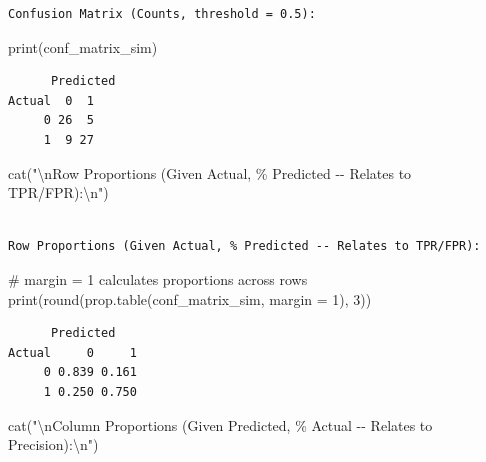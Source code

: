 \documentclass[
  letterpaper,
  DIV=11,
  numbers=noendperiod]{scrreprt}
\newenvironment{Shaded}{\begin{snugshade}}{\end{snugshade}}
\newcommand{\AttributeTok}[1]{\textcolor[rgb]{0.40,0.45,0.13}{#1}}
\newcommand{\CommentTok}[1]{\textcolor[rgb]{0.37,0.37,0.37}{#1}}
\newcommand{\DecValTok}[1]{\textcolor[rgb]{0.68,0.00,0.00}{#1}}
\newcommand{\FunctionTok}[1]{\textcolor[rgb]{0.28,0.35,0.67}{#1}}
\newcommand{\NormalTok}[1]{\textcolor[rgb]{0.00,0.23,0.31}{#1}}
\newcommand{\SpecialCharTok}[1]{\textcolor[rgb]{0.37,0.37,0.37}{#1}}
\newcommand{\StringTok}[1]{\textcolor[rgb]{0.13,0.47,0.30}{#1}}
\begin{document}
\begin{verbatim}
Confusion Matrix (Counts, threshold = 0.5):
\end{verbatim}

\begin{Shaded}
\begin{Highlighting}[]
\FunctionTok{print}\NormalTok{(conf\_matrix\_sim)}
\end{Highlighting}
\end{Shaded}

\begin{verbatim}
      Predicted
Actual  0  1
     0 26  5
     1  9 27
\end{verbatim}

\begin{Shaded}
\begin{Highlighting}[]
\FunctionTok{cat}\NormalTok{(}\StringTok{"}\SpecialCharTok{\textbackslash{}n}\StringTok{Row Proportions (Given Actual, \% Predicted {-}{-} Relates to TPR/FPR):}\SpecialCharTok{\textbackslash{}n}\StringTok{"}\NormalTok{)}
\end{Highlighting}
\end{Shaded}

\begin{verbatim}

Row Proportions (Given Actual, % Predicted -- Relates to TPR/FPR):
\end{verbatim}

\begin{Shaded}
\begin{Highlighting}[]
\CommentTok{\# margin = 1 calculates proportions across rows}
\FunctionTok{print}\NormalTok{(}\FunctionTok{round}\NormalTok{(}\FunctionTok{prop.table}\NormalTok{(conf\_matrix\_sim, }\AttributeTok{margin =} \DecValTok{1}\NormalTok{), }\DecValTok{3}\NormalTok{))}
\end{Highlighting}
\end{Shaded}

\begin{verbatim}
      Predicted
Actual     0     1
     0 0.839 0.161
     1 0.250 0.750
\end{verbatim}

\begin{Shaded}
\begin{Highlighting}[]
\FunctionTok{cat}\NormalTok{(}\StringTok{"}\SpecialCharTok{\textbackslash{}n}\StringTok{Column Proportions (Given Predicted, \% Actual {-}{-} Relates to Precision):}\SpecialCharTok{\textbackslash{}n}\StringTok{"}\NormalTok{)}
\end{Highlighting}
\end{Shaded}
\end{document}
